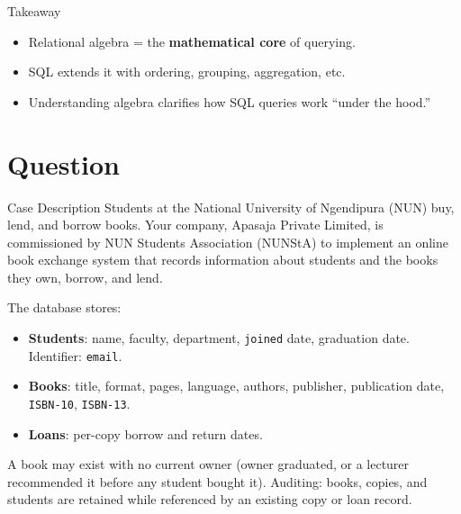\documentclass{beamer}
\begin{document}
\begin{frame}{Takeaway}
\begin{itemize}
  \item Relational algebra = the \textbf{mathematical core} of querying.
  \item SQL extends it with ordering, grouping, aggregation, etc.
  \item Understanding algebra clarifies how SQL queries work “under the hood.”
\end{itemize}
\end{frame}

\section{Question}

\begin{frame}{Case Description}
\small
Students at the National University of Ngendipura (NUN) buy, lend, and borrow books.
Your company, Apasaja Private Limited, is commissioned by NUN Students Association (NUNStA) to implement an online book exchange system that records information about students and the books they own, borrow, and lend.

The database stores:
\begin{itemize}
  \item \textbf{Students}: name, faculty, department, \texttt{joined} date, graduation date. Identifier: \texttt{email}.
  \item \textbf{Books}: title, format, pages, language, authors, publisher, publication date, \texttt{ISBN-10}, \texttt{ISBN-13}.
  \item \textbf{Loans}: per-copy borrow and return dates.
\end{itemize}
A book may exist with no current owner (owner graduated, or a lecturer recommended it before any student bought it).
Auditing: books, copies, and students are retained while referenced by an existing copy or loan record.
\end{frame}
\end{document}
